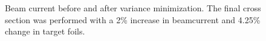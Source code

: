\pagestyle{empty}
\begin{figure}%
    \centering
    \hfill
    \caption{Beam current before and after variance minimization. The final cross section was performed with a 2\% increase in beamcurrent and 4.25\% change in target foils. }%
    \label{fig:varmin_beamcurrent}%
\end{figure}

